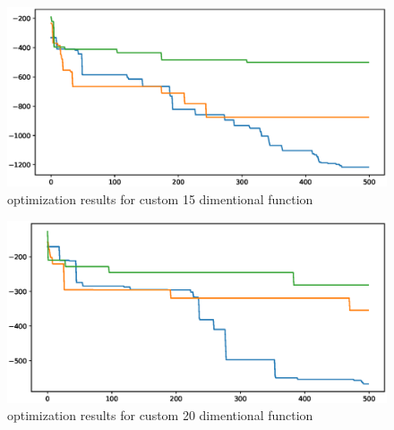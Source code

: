 \documentclass[11pt,a4paper]{article}
\begin{document}
\begin{figure}[H]
	\centering
	\includegraphics[scale=0.6]{fun1_3.eps}
	\caption{optimization results for custom 15 dimentional function}
\end{figure}

\begin{figure}[H]
	\centering
	\includegraphics[scale=0.6]{fun1_4.eps}
	\caption{optimization results for custom 20 dimentional function}
\end{figure}
\end{document}
